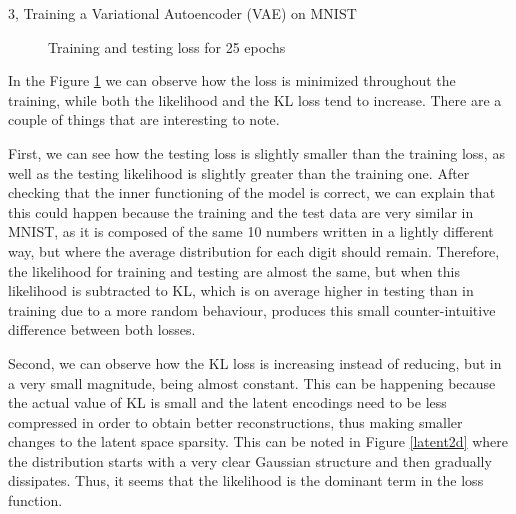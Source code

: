 \begin{task}{3, Training a Variational Autoencoder (VAE) on MNIST}
\begin{figure}[H]
    \centering
    \caption{Training and testing loss for 25 epochs}
    \label{loss25}
\end{figure}

In the Figure \ref{loss25} we can observe how the loss is minimized throughout the training, while both the likelihood and the KL loss tend to increase. There are a couple of things that are interesting to note. 

First, we can see how the testing loss is slightly smaller than the training loss, as well as the testing likelihood is slightly greater than the training one. After checking that the inner functioning of the model is correct, we can explain that this could happen because the training and the test data are very similar in MNIST, as it is composed of the same 10 numbers written in a lightly different way, but where the average distribution for each digit should remain. Therefore, the likelihood for training and testing are almost the same, but when this likelihood is subtracted to KL, which is on average higher in testing than in training due to a more random behaviour, produces this small counter-intuitive difference between both losses.

Second, we can observe how the KL loss is increasing instead of reducing, but in a very small magnitude, being almost constant. This can be happening because the actual value of KL is small and the latent encodings need to be less compressed in order to obtain better reconstructions, thus making smaller changes to the latent space sparsity. This can be noted in Figure \ref{latent2d} where the distribution starts with a very clear Gaussian structure and then gradually dissipates. Thus, it seems that the likelihood is the dominant term in the loss function.


\end{task}
